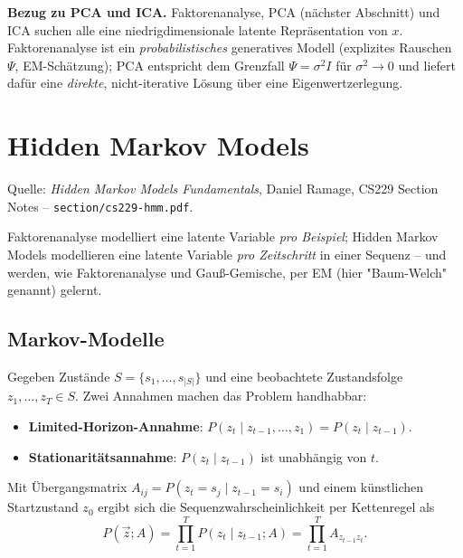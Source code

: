\documentclass[11pt]{article}
\theoremstyle{csthm}
\theoremstyle{csdef}
\begin{document}
\begin{tcolorbox}[defstyle]
\textbf{Bezug zu PCA und ICA.} Faktorenanalyse, PCA (nächster Abschnitt) und
ICA suchen alle eine niedrigdimensionale latente Repräsentation von $x$.
Faktorenanalyse ist ein \emph{probabilistisches} generatives Modell
(explizites Rauschen $\Psi$, EM-Schätzung); PCA entspricht dem Grenzfall
$\Psi = \sigma^2 I$ für $\sigma^2\to 0$ und liefert dafür eine \emph{direkte},
nicht-iterative Lösung über eine Eigenwertzerlegung.
\end{tcolorbox}

\section{Hidden Markov Models}

\begin{tcolorbox}[srcstyle]
Quelle: \emph{Hidden Markov Models Fundamentals}, Daniel Ramage, CS229
Section Notes -- \texttt{section/cs229-hmm.pdf}.
\end{tcolorbox}

Faktorenanalyse modelliert eine latente Variable \emph{pro Beispiel};
Hidden Markov Models modellieren eine latente Variable \emph{pro Zeitschritt}
in einer Sequenz -- und werden, wie Faktorenanalyse und Gauß-Gemische, per
EM (hier "Baum-Welch" genannt) gelernt.

\subsection{Markov-Modelle}

Gegeben Zustände $S=\{s_1,\ldots,s_{|S|}\}$ und eine beobachtete
Zustandsfolge $z_1,\ldots,z_T \in S$. Zwei Annahmen machen das Problem
handhabbar:
\begin{itemize}
  \item \textbf{Limited-Horizon-Annahme}: $P(z_t \mid z_{t-1},\ldots,z_1) = P(z_t\mid z_{t-1})$.
  \item \textbf{Stationaritätsannahme}: $P(z_t\mid z_{t-1})$ ist unabhängig von $t$.
\end{itemize}
Mit Übergangsmatrix $A_{ij} = P(z_t{=}s_j \mid z_{t-1}{=}s_i)$ und einem
künstlichen Startzustand $z_0$ ergibt sich die Sequenzwahrscheinlichkeit per
Kettenregel als
\begin{equation}
  P(\vec z; A) = \prod_{t=1}^T P(z_t \mid z_{t-1}; A) = \prod_{t=1}^T A_{z_{t-1} z_t}.
\end{equation}
\end{document}
